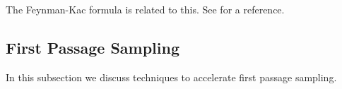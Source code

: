 \documentclass[a4paper,12pt]{article}
\begin{document}

\begin{related}
    The Feynman-Kac formula is related to this. See \cite{oksendal_stochastic_2003}
    for a reference.
\end{related}



\subsection{First Passage Sampling}

In this subsection we discuss techniques to accelerate first passage sampling.
\end{document}
